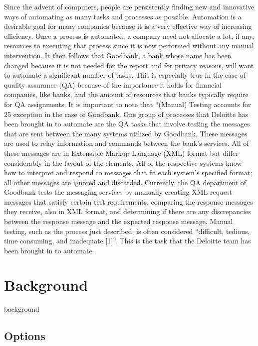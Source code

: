 \documentclass[12pt]{article}
\begin{document}
Since the advent of computers, people are persistently finding new and innovative 
ways of automating as many tasks and processes as possible. Automation is a desirable 
goal for many companies because it is a very effective way of increasing efficiency. 
Once a process is automated, a company need not allocate a lot, if any, resources to 
executing that process since it is now performed without any manual intervention. It then 
follows that Goodbank, a bank whose name has been changed because it is not needed for 
the report and for privacy reasons, will want to automate a significant number of tasks. 
This is especially true in the case of quality assurance (QA) because of the importance it 
holds for financial companies, like banks, and the amount of resources that banks 
typically require for QA assignments. It is important to note that “(Manual) Testing 
accounts for 25%
exception in the case of Goodbank. One group of processes that Deloitte has been 
brought in to automate are the QA tasks that involve testing the messages that are sent 
between the many systems utilized by Goodbank. These messages are used to relay 
information and commands between the bank’s services. All of these messages are in 
Extensible Markup Language (XML) format but differ considerably in the layout of the 
elements. All of the respective systems know how to interpret and respond to messages 
that fit each system’s specified format; all other messages are ignored and discarded. 
Currently, the QA department of Goodbank tests the messaging services by manually 
creating XML request messages that satisfy certain test requirements, comparing the 
response messages they receive, also in XML format, and determining if there are any 
discrepancies between the response message and the expected response message. Manual 
testing, such as the process just described, is often considered “difficult, tedious, time 
consuming, and inadequate [1]”. This is the task that the Deloitte team has been brought 
in to automate.



\newpage

\section{Background}
background
\subsection{Options}
\end{document}
